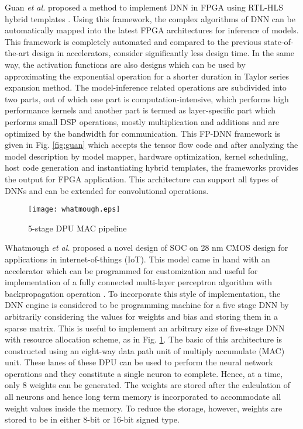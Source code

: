 \documentclass[journal]{IEEEtran}
\begin{document}
\par Guan \textit{et al.} proposed a method to implement DNN in FPGA using RTL-HLS hybrid templates \cite{paper10}. Using this framework, the complex algorithms of DNN can be automatically mapped into the latest FPGA architectures for inference of models. This framework is completely automated and compared to the previous state-of-the-art design in accelerators, consider significantly less design time. In the same way, the activation functions are also designs which can be used by approximating the exponential operation for a shorter duration in Taylor series expansion method. The model-inference related operations are subdivided into two parts, out of which one part is computation-intensive, which performs high performance kernels and another part is termed as layer-specific part which performs small DSP operations, mostly multiplication and additions and are optimized by the bandwidth for communication. This FP-DNN framework is given in Fig. \ref{fig:guan} which accepts the tensor flow code and after analyzing the model description by model mapper, hardware optimization, kernel scheduling, host code generation and instantiating hybrid templates, the frameworks provides the output for FPGA application. This architecture can support all types of DNNs and can be extended for convolutional operations.

\begin{figure}[t]
    \centering
    \texttt{[image: whatmough.eps]}
    \caption{5-stage DPU MAC pipeline \cite{paper11}}
    \label{fig:whatmough}
\end{figure}

\par Whatmough \textit{et al.} proposed a novel design of SOC on 28 nm CMOS design for applications in internet-of-things (IoT). This model came in hand with an accelerator which can be programmed for customization and useful for implementation of a fully connected multi-layer perceptron algorithm with backpropagation operation \cite{paper11}. To incorporate this style of implementation, the DNN engine is considered to be programming machine for a five stage DNN by arbitrarily considering the values for weights and bias and storing them in a sparse matrix. This is useful to implement an arbitrary size of five-stage DNN with resource allocation scheme, as in Fig. \ref{fig:whatmough}. The basic of this architecture is constructed using an eight-way data path unit of multiply accumulate (MAC) unit. These lanes of these DPU can be used to perform the neural network operations and they constitute a single neuron to complete. Hence, at a time, only 8 weights can be generated. The weights are stored after the calculation of all neurons and hence long term memory is incorporated to accommodate all weight values inside the memory. To reduce the storage, however, weights are stored to be in either 8-bit or 16-bit signed type.
\end{document}

